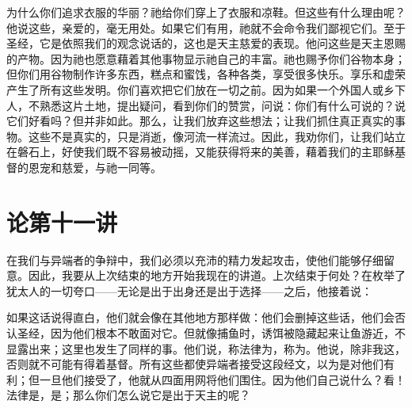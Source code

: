 为什么你们追求衣服的华丽？祂给你们穿上了衣服和凉鞋。但这些有什么理由呢？他说这些，亲爱的，毫无用处。如果它们有用，祂就不会命令我们鄙视它们。至于圣经，它是依照我们的观念说话的，这也是天主慈爱的表现。他问这些是天主恩赐的产物。因为祂也愿意藉着其他事物显示祂自己的丰富。祂也赐予你们谷物本身；但你们用谷物制作许多东西，糕点和蜜饯，各种各类，享受很多快乐。享乐和虚荣产生了所有这些发明。你们喜欢把它们放在一切之前。因为如果一个外国人或乡下人，不熟悉这片土地，提出疑问，看到你们的赞赏，问说：你们有什么可说的？说它们好看吗？但并非如此。那么，让我们放弃这些想法；让我们抓住真正真实的事物。这些不是真实的，只是消逝，像河流一样流过。因此，我劝你们，让我们站立在磐石上，好使我们既不容易被动摇，又能获得将来的美善，藉着我们的主耶稣基督的恩宠和慈爱，与祂一同等。\par



\section{论第十一讲}

\par

\par

在我们与异端者的争辩中，我们必须以充沛的精力发起攻击，使他们能够仔细留意。因此，我要从上次结束的地方开始我现在的讲道。上次结束于何处？在枚举了犹太人的一切夸口——无论是出于出身还是出于选择——之后，他接着说：\par

如果这话说得直白，他们就会像在其他地方那样做：他们会删掉这些话，他们会否认圣经，因为他们根本不敢面对它。但就像捕鱼时，诱饵被隐藏起来让鱼游近，不显露出来；这里也发生了同样的事。他们说，称法律为，称为。他说，除非我这，否则就不可能有得着基督。所有这些都使异端者接受这段经文，以为是对他们有利；但一旦他们接受了，他就从四面用网将他们围住。因为他们自己说什么？看！法律是，是；那么你们怎么说它是出于天主的呢？\par

